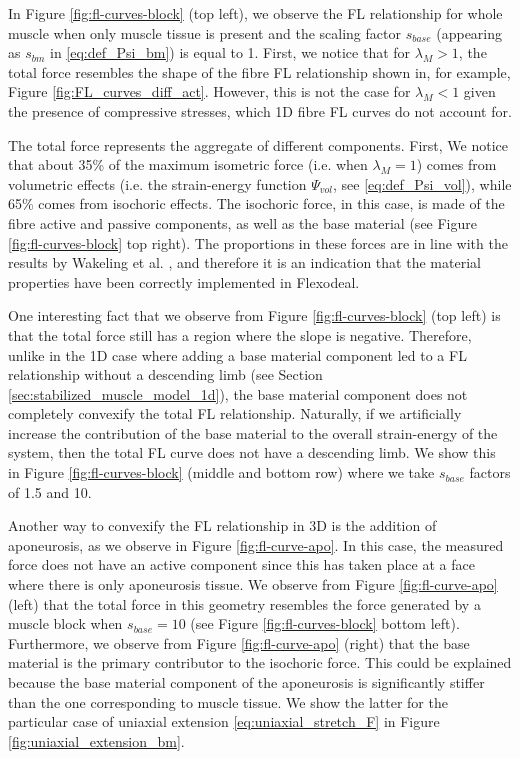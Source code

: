 \documentclass{sfuthesis}
\numberwithin{equation}{section}
\numberwithin{figure}{chapter}
\numberwithin{table}{chapter}
\theoremstyle{definition}
\begin{document}
In Figure \ref{fig:fl-curves-block} (top left), we observe the FL relationship for whole muscle when only muscle tissue is present and the scaling factor $s_{base}$ (appearing as $s_{bm}$ in \eqref{eq:def_Psi_bm}) is equal to 1. First, we notice that for $\lambda_M > 1$, the total force resembles the shape of the fibre FL relationship shown in, for example, Figure \ref{fig:FL_curves_diff_act}. However, this is not the case for $\lambda_M < 1$ given the presence of compressive stresses, which 1D fibre FL curves do not account for.

The total force represents the aggregate of different components. First, We notice that about 35\% of the maximum isometric force (i.e. when $\lambda_M = 1$) comes from volumetric effects (i.e. the strain-energy function $\Psi_{vol}$, see \eqref{eq:def_Psi_vol}), while 65\% comes from isochoric effects. The isochoric force, in this case, is made of the fibre active and passive components, as well as the base material (see Figure \ref{fig:fl-curves-block} top right). The proportions in these forces are in line with the results by Wakeling et al. \cite{Paper1_WakelingEtAl2020}, and therefore it is an indication that the material properties have been correctly implemented in Flexodeal.

One interesting fact that we observe from Figure \ref{fig:fl-curves-block} (top left) is that the total force still has a region where the slope is negative. Therefore, unlike in the 1D case where adding a base material component led to a FL relationship without a descending limb (see Section \ref{sec:stabilized_muscle_model_1d}), the base material component does not completely convexify the total FL relationship. Naturally, if we artificially increase the contribution of the base material to the overall strain-energy of the system, then the total FL curve does not have a descending limb. We show this in Figure \ref{fig:fl-curves-block} (middle and bottom row) where we take $s_{base}$ factors of 1.5 and 10.

Another way to convexify the FL relationship in 3D is the addition of aponeurosis, as we observe in Figure \ref{fig:fl-curve-apo}. In this case, the measured force does not have an active component since this has taken place at a face where there is only aponeurosis tissue. We observe from Figure \ref{fig:fl-curve-apo} (left) that the total force in this geometry resembles the force generated by a muscle block when $s_{base} = 10$ (see Figure \ref{fig:fl-curves-block} bottom left).
Furthermore, we observe from Figure \ref{fig:fl-curve-apo} (right) that the base material is the primary contributor to the isochoric force. This could be explained because the base material component of the aponeurosis is significantly stiffer than the one corresponding to muscle tissue. We show the latter for the particular case of uniaxial extension \eqref{eq:uniaxial_stretch_F} in Figure \ref{fig:uniaxial_extension_bm}.
\end{document}

